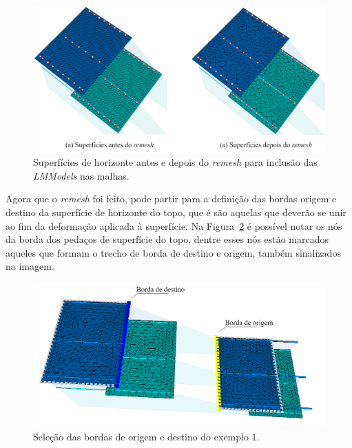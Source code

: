\begin{figure} [H]
  \begin{center}
    \includegraphics[width=\textwidth]{images/fig-example-1-3}
    \caption{Superfícies de horizonte antes e depois do \textit{remesh} para inclusão das \textit{LMModels} nas malhas.}\label{fig-example-1-3}
  \end{center}
\end{figure}

Agora que o \textit{remesh} foi feito, pode partir para a definição das bordas origem e destino da superfície de horizonte do topo, que é são aquelas que deverão se unir ao fim da deformação aplicada à superfície. Na Figura~\ref{fig-example-1-4} é possível notar os nós da borda dos pedaços de superfície do topo, dentre esses nós estão marcados aqueles que formam o trecho de borda de destino e origem, também sinalizados na imagem.

\begin{figure} [H]
  \begin{center}
    \includegraphics[width=350pt]{images/fig-example-1-4}
    \caption{Seleção das bordas de origem e destino do exemplo 1.}\label{fig-example-1-4}
  \end{center}
\end{figure}

